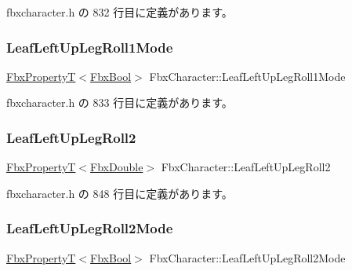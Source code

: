  fbxcharacter.\+h の 832 行目に定義があります。

\mbox{\label{class_fbx_character_a9508a14e57125380ebe057f87232f05b}} 
\subsubsection{\texorpdfstring{Leaf\+Left\+Up\+Leg\+Roll1\+Mode}{LeafLeftUpLegRoll1Mode}}
{\footnotesize\ttfamily \hyperlink{class_fbx_property_t}{Fbx\+PropertyT}$<$\hyperlink{fbxtypes_8h_a92e0562b2fe33e76a242f498b362262e}{Fbx\+Bool}$>$ Fbx\+Character\+::\+Leaf\+Left\+Up\+Leg\+Roll1\+Mode}



 fbxcharacter.\+h の 833 行目に定義があります。

\mbox{\label{class_fbx_character_ae4cff2fface397e9cc73e1a23e79c0d5}} 
\subsubsection{\texorpdfstring{Leaf\+Left\+Up\+Leg\+Roll2}{LeafLeftUpLegRoll2}}
{\footnotesize\ttfamily \hyperlink{class_fbx_property_t}{Fbx\+PropertyT}$<$\hyperlink{fbxtypes_8h_a171e72a1c46fc15c1a6c9c31948c1c5b}{Fbx\+Double}$>$ Fbx\+Character\+::\+Leaf\+Left\+Up\+Leg\+Roll2}



 fbxcharacter.\+h の 848 行目に定義があります。

\mbox{\label{class_fbx_character_aec26440a6eb3ddf1451bca2a9c09ac21}} 
\subsubsection{\texorpdfstring{Leaf\+Left\+Up\+Leg\+Roll2\+Mode}{LeafLeftUpLegRoll2Mode}}
{\footnotesize\ttfamily \hyperlink{class_fbx_property_t}{Fbx\+PropertyT}$<$\hyperlink{fbxtypes_8h_a92e0562b2fe33e76a242f498b362262e}{Fbx\+Bool}$>$ Fbx\+Character\+::\+Leaf\+Left\+Up\+Leg\+Roll2\+Mode}



